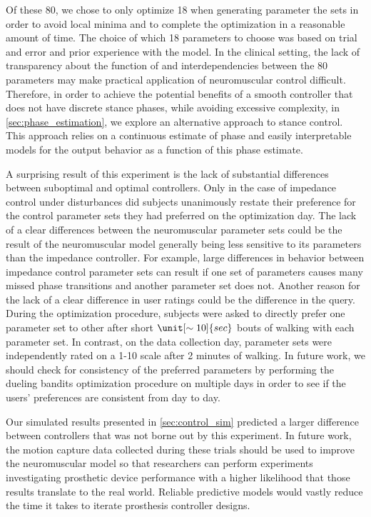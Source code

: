 Of these 80, we chose to only optimize 18 when generating parameter the sets in
order to avoid local minima and to complete the optimization in a reasonable
amount of time. The choice of which 18 parameters to choose was based on trial
and error and prior experience with the model. In the clinical setting, the lack
of transparency about the function of and interdependencies between the 80
parameters may make practical application of neuromuscular control difficult.
Therefore, in order to achieve the potential benefits of a smooth controller
that does not have discrete stance phases, while avoiding excessive complexity,
in \cref{sec:phase_estimation}, we explore an alternative approach to stance
control. This approach relies on a continuous estimate of phase and easily
interpretable models for the output behavior as a function of this phase
estimate.

A surprising result of this experiment is the lack of substantial differences
between suboptimal and optimal controllers. Only in the case of impedance
control under disturbances did subjects unanimously restate their preference for
the control parameter sets they had preferred on the optimization day. The lack
of a clear differences between the neuromuscular parameter sets could be the
result of the neuromuscular model generally being less sensitive to its
parameters than the impedance controller. For example, large differences in
behavior between impedance control parameter sets can result if one set of
parameters causes many missed phase transitions and another parameter set does
not. Another reason for the lack of a clear difference in user ratings could be
the difference in the query. During the optimization procedure, subjects were
asked to directly prefer one parameter set to other after short
$\unit[\sim10]{sec}$ bouts of walking with each parameter set. In contrast, on
the data collection day, parameter sets were independently rated on a 1-10 scale
after 2 minutes of walking. In future work, we should check for consistency of
the preferred parameters by performing the dueling bandits optimization
procedure on multiple days in order to see if the users' preferences are
consistent from day to day.

Our simulated results presented in \cref{sec:control_sim} predicted a larger
difference between controllers that was not borne out by this experiment.  In
future work, the motion capture data collected during these trials should be
used to improve the neuromuscular model so that researchers can perform
experiments investigating prosthetic device performance with a higher likelihood
that those results translate to the real world. Reliable predictive models would
vastly reduce the time it takes to iterate prosthesis controller designs.

